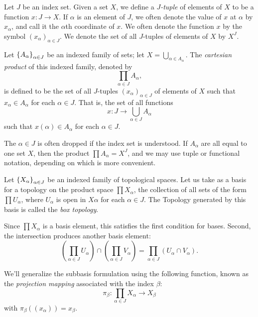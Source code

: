 \documentclass[10pt]{report}
\begin{document}
\begin{definition}
  Let $J$ be an index set.
  Given a set $X$, we define a \emph{$J$-tuple} of elements of $X$ to be a function $x:J \rightarrow X$.
  If $\alpha$ is an element of $J$, we often denote the value of $x$ at $\alpha$ by $x_\alpha$, and call it the $\alpha$th coordinate of $x$.
  We often denote the function $x$ by the symbol $(x_\alpha)_{\alpha \in J}$.
  We denote the set of all $J$-tuples of elements of $X$ by $X^J$.
\end{definition}

\begin{definition}
  Let $\left\{ A_\alpha \right\}_{\alpha \in J}$ be an indexed family of sets;
  let $X = \bigcup_{\alpha \in A_\alpha}$.
  The \emph{cartesian product} of this indexed family, denoted by
  \[
    \prod_{\alpha \in J} A_\alpha,
  \]
  is defined to be the set of all $J$-tuples $(x_\alpha)_{\alpha \in J}$ of elements of $X$ such that $x_\alpha \in A_\alpha$ for each $\alpha \in J$.
  That is, the set of all functions
  \[
    x: J \rightarrow \bigcup_{\alpha \in J} A_\alpha
  \]
  such that $x(\alpha) \in A_\alpha$ for each $\alpha \in J$.
\end{definition}

The $\alpha \in J$ is often dropped if the index set is understood.
If $A_\alpha$ are all equal to one set $X$, then the product $\prod A_\alpha = X^J$, and we may use tuple or functional notation, depending on which is more convenient.

\begin{definition}
  Let $\left\{ X_\alpha \right\}_{\alpha \in J}$ be an indexed family of topological spaces.
  Let us take as a basis for a topology on the product space $\prod X_\alpha$, the collection of all sets of the form $\prod U_\alpha$, where $U_\alpha$ is open in $X \alpha$ for each $\alpha \in J$.
  The Topology generated by this basis is called the \emph{box topology}.
\end{definition}

Since $\prod X_\alpha$ is a basis element, this satisfies the first condition for bases.
Second, the intersection produces another basis element:
\[
  (\prod_{\alpha \in J} U_\alpha) \cap (\prod_{\alpha \in J} V_\alpha)
  = \prod_{\alpha \in J}(U_\alpha \cap V_\alpha).
\]

We'll generalize the subbasis formulation using the following function, known as the \emph{projection mapping} associated with the index $\beta$:
\[
  \pi_\beta: \prod_{\alpha \in J} X_\alpha \rightarrow X_\beta
\]
with $\pi_\beta((x_\alpha)) = x_\beta$.
\end{document}
